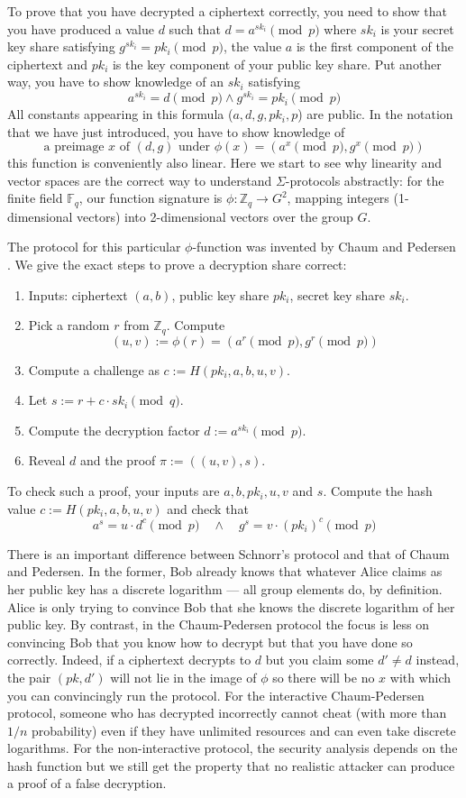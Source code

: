 \documentclass{llncs}
\begin{document}
To prove that you have decrypted a ciphertext correctly, you need to show that
you have produced a value $d$ such that $d = a^{sk_i} \pmod{p}$ where $sk_i$ is
your secret key share satisfying $g^{sk_i} = pk_i \pmod{p}$, the value $a$ is
the first component of the ciphertext and $pk_i$ is the key component of your
public key share. Put another way, you have to show knowledge of an $sk_i$
satisfying
\[
a^{sk_i} = d \pmod{p} \wedge g^{sk_i} = pk_i \pmod{p}
\]
All constants appearing in this formula ($a, d, g, pk_i, p$) are public.
In the notation that we have just introduced, you have to show knowledge of
\[
\textrm{a preimage } x \textrm{ of } (d, g) \textrm { under } \phi(x) =
( a^x \pmod{p}, g^x \pmod{p})
\]
this function is conveniently also linear. Here we start to see why linearity
and vector spaces are the correct way to understand $\Sigma$-protocols 
abstractly: for the finite field $\mathbb F_q$, our function signature is
$\phi: \mathbb Z_q \to G^2$, mapping integers (1-dimensional vectors) into
2-dimensional vectors over the group $G$.

The protocol for this particular $\phi$-function was invented by Chaum and
Pedersen \cite{CP92}. We give the exact steps to prove a decryption share
correct:
\begin{enumerate}
\item Inputs: ciphertext $(a, b)$, public key share $pk_i$, secret key share
$sk_i$.
\item Pick a random $r$ from $\mathbb Z_q$. Compute 
\[
(u, v) := \phi(r) = (a^r \pmod{p}, g^r \pmod{p})
\]
\item Compute a challenge as $c := H(pk_i, a, b, u, v)$.
\item Let $s := r + c \cdot sk_i \pmod{q}$.
\item Compute the decryption factor $d := a^{sk_i} \pmod{p}$.
\item Reveal $d$ and the proof $\pi := ((u, v), s)$.
\end{enumerate}
To check such a proof, your inputs are $a, b, pk_i, u, v$ and $s$.
Compute the hash value $c := H(pk_i, a, b, u, v)$ and check that
\[
a^s = u \cdot d^c \pmod{p} \quad \wedge \quad g^s = v \cdot (pk_i)^c \pmod{p}
\]

There is an important difference between Schnorr's protocol and that of Chaum
and Pedersen. In the former, Bob already knows that whatever Alice claims as her
public key has a discrete logarithm --- all group elements do, by definition.
Alice is only trying to convince Bob that she knows the discrete logarithm of
her public key.
By contrast, in the Chaum-Pedersen protocol the focus is less on convincing Bob
that you know how to decrypt but that you have done so correctly. Indeed, if a
ciphertext decrypts to $d$ but you claim some $d' \neq d$ instead, the pair
$(pk, d')$ will not lie in the image of $\phi$ so there will be no $x$ with
which you can convincingly run the protocol. For the interactive Chaum-Pedersen
protocol, someone who has decrypted incorrectly cannot cheat (with more than
$1/n$ probability) even if they have unlimited resources and can even take
discrete logarithms. For the non-interactive protocol, the security analysis
depends on the hash function but we still get the property that no realistic
attacker can produce a proof of a false decryption.
\end{document}
